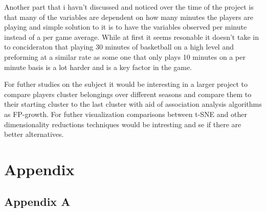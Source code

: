 \documentclass{article}
\begin{document}
Another part that i havn't discussed and noticed over the time of the project is that many of the variables are dependent on how many minutes the players are playing and simple solution to it is to have the variables observed  per minute instead of a per game average. While at first it seems resonable it doesn't take in to concideraton that playing 30 minutes of basketball on a high level and preforming at a similar rate as some one that only plays 10 minutes on a per minute basis is a lot harder and is a key factor in the game.

For futher studies on the subject it would be interesting in a larger project to compare players cluster belongings over different seasons and compare them to their starting cluster to the last cluster with aid of association analysis algorithms as FP-growth. For futher visualization comparisons between t-SNE and other dimensionality reductions techniques would be intresting and se if there are better alternatives. 



\section{Appendix}
\subsection{Appendix A}
\end{document}

